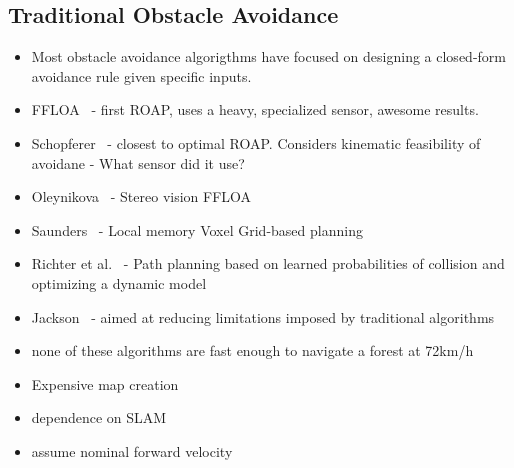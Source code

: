 \documentclass[paper=a4, fontsize=11pt]{scrartcl} %
\begin{document}
	\subsection{Traditional Obstacle Avoidance}
	\begin{itemize}
		\item Most obstacle avoidance algorigthms have focused on designing a closed-form avoidance rule given specific inputs.
		\item FFLOA~\cite{Scherer2007} - first ROAP, uses a heavy, specialized sensor, awesome results.
		\item Schopferer~\cite{Schopferer2014} - closest to optimal ROAP.  Considers kinematic feasibility of avoidane - What sensor did it use?
		\item Oleynikova~\cite{Oleynikova2015} - Stereo vision FFLOA
		\item Saunders~\cite{Saunders2009} - Local memory Voxel Grid-based planning
		\item Richter et al.~\cite{Richter2014} - Path planning based on learned probabilities of collision and optimizing a dynamic model
		\item Jackson~\cite{CEPA} - aimed at reducing limitations imposed by traditional algorithms
		\item none of these algorithms are fast enough to navigate a forest at 72km/h
		\item Expensive map creation
		\item dependence on SLAM
		\item assume nominal forward velocity
	\end{itemize}
\end{document}
